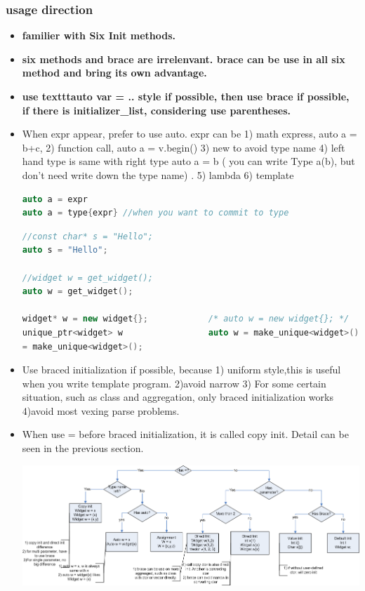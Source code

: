\documentclass[a4paper,12pt,twoside]{book}
\begin{document}
\subsubsection{usage direction}
\begin{itemize}
	\item \textbf{familier with Six Init methods.}
	
	\item \textbf{six methods and brace are irrelenvant. brace can be use in all six method and bring its own advantage.}
	
	\item \textbf{use texttt{auto var = ..} style if possible, then use brace if possible, if there is initializer\_list, considering use parentheses.}
	
	\item When expr appear, prefer to use auto. expr can be 1) math express, auto a = b+c, 2) function call, auto a = v.begin() 3) new to avoid type name 4) left hand type is same with right type auto a = b ( you can write Type a(b), but don't need write down the type name) . 5) lambda 6) template 
\begin{lstlisting}[frame=single, language=c++]
auto a = expr
auto a = type{expr} //when you want to commit to type
\end{lstlisting}
	
\begin{lstlisting}[frame=single, language=c++]
//const char* s = "Hello";             
auto s = "Hello";
	
//widget w = get_widget();             
auto w = get_widget();
	
widget* w = new widget{};            /* auto w = new widget{}; */
unique_ptr<widget> w                 auto w = make_unique<widget>();
= make_unique<widget>();
	\end{lstlisting}
	
	\item Use braced initialization if possible, because 1) uniform style,this is useful when you write template program. 2)avoid narrow 3) For some certain situation, such as class and aggregation, only braced initialization works 4)avoid most vexing parse problems.

	\item When use = before braced initialization, it is called copy init. Detail can be seen in the previous section.
	
	\includegraphics[scale=0.4]{pics/init.png}
	

\end{itemize}
\end{document}
